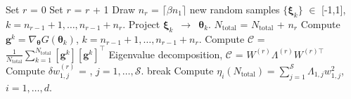 \begin{breakablealgorithm}
\begin{algorithmic}[1]
	\State Set $r$ = 0
	\Loop
		\State Set $r$ = $r$ + 1
		\State Draw $n_r$ = $\lceil \beta n_1 \rceil$ new random samples 
                $\{\bm{\xi}_k\}$ $\in$ [-1,1], $k = n_{r-1}+1,\ldots,n_{r-1}+n_r$.
		\State Project $\bm{\xi}_k$~$\rightarrow$~$\bm{\theta}_k$.
		\State $N_\text{total}$ = $N_\text{total}$ + $n_r$ 
		\State Compute $\bm{g}^k = \nabla_{\bm{\theta}}G(\bm\theta_k)$, 
             	$k=n_{r-1}+1, \ldots, n_{r-1}+n_r$.  
		\State Compute $\mathcal{C}$ = 
        	$\frac{1}{N_\text{total}}\sum\limits_{k=1}^{N_\text{total}}[\bm{g}^k][\bm{g}^k]^\top$
		\State Eigenvalue decomposition, $\mathcal{C}$ = $W^{(r)}\Lambda^{(r)} W^{(r)\top}$
		\State Compute $\delta w_{1,j}^{(r)}$ = 
                       , 
                       $j = 1,\ldots,\mathcal{S}$.
			\State break
		\EndIf
	\EndLoop
	\State Compute $\eta_i(N_\text{total}) = \sum\limits_{j=1}^{\mathcal{S}} \Lambda_{1,j}w_{1,j}^2$,
	$i=1,\ldots,d$.
	
    \EndProcedure
  \end{algorithmic}
  \label{alg:grad}
\end{breakablealgorithm}
\bigskip

